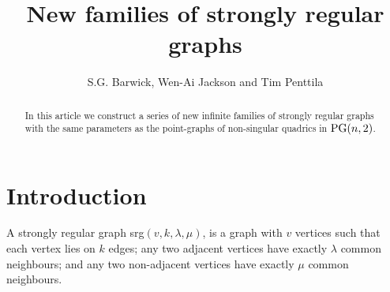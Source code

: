 \documentclass[12pt]{article}
\newcommand\PG{{\rm PG}}
\newcommand\red[1]{{\color{red} #1}}
\newcommand\blue[1]{{\color{blue} #1}}
\begin{document}
%
%

\title{New families of strongly regular graphs}

\author{S.G. Barwick, Wen-Ai Jackson and Tim Penttila}
\maketitle
%
%
%
%
%
\begin{abstract} In this article we construct a series of new infinite families of strongly regular graphs with the same parameters as the point-graphs of non-singular quadrics in $\PG(n,2)$. 
\end{abstract}
%

\section{Introduction}


A strongly regular graph srg$(v,k,\lambda,\mu)$, is a graph with  $v$ vertices such that
each vertex lies on $k$ edges;
any two adjacent vertices have exactly $\lambda$ common neighbours; and 
any two non-adjacent vertices have exactly $\mu$ common neighbours.

%
%
\end{document}
